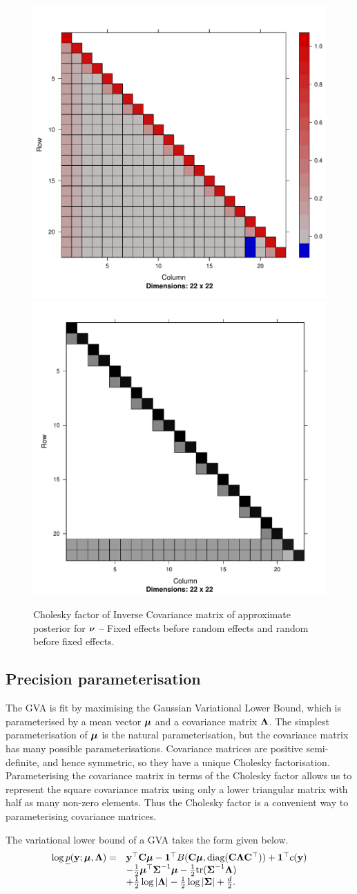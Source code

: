 \begin{figure}[h!]
	\includegraphics[width=0.35 \textwidth]{mX_mZ_cholesky.pdf}
	\includegraphics[width=0.35 \textwidth]{mZ_mX_cholesky.pdf}
	\bigskip 
	\caption{Cholesky factor of Inverse Covariance matrix of approximate posterior for ${\boldsymbol \nu}$ -- Fixed effects 
						before random effects and random before fixed effects.}
	\label{fig:cholfixedrandom}
\end{figure}

\newpage

\subsection{Precision parameterisation}

The GVA is fit by maximising the Gaussian
Variational Lower Bound, which is parameterised by a mean vector ${\boldsymbol \mu}$ and a
covariance matrix ${\boldsymbol \Lambda}$. The simplest parameterisation of ${\boldsymbol \mu}$ is the
natural parameterisation, but the covariance matrix has many possible
parameterisations. Covariance matrices are positive semi-definite, and hence
symmetric, so they have a unique Cholesky factorisation. Parameterising the
covariance matrix in terms of the Cholesky factor allows us to represent the
square covariance matrix using only a lower triangular matrix with half as many
non-zero elements. Thus the Cholesky factor is a convenient way to parameterising
covariance matrices.

The variational lower bound of a GVA takes the
form given below.
\begin{equation}
\label{eq:gva_lower_bound_precision_param2}
\begin{array}{ll}
\log \underline{p}({\bf y}; {\boldsymbol \mu}, {\boldsymbol \Lambda}) =& {\bf y}^\top {\bf C} {\boldsymbol\mu} - {\bf 1}^\top B({\bf C} {\boldsymbol \mu}, \text{diag}({\bf C} {\boldsymbol \Lambda} {\bf C}^\top)) + {\bf 1}^\top c({\bf y}) \\
&- \tfrac{1}{2} {\boldsymbol \mu}^\top {\boldsymbol\Sigma}^{-1} {\boldsymbol \mu} - \tfrac{1}{2} \text{tr}({\boldsymbol \Sigma}^{-1} {\boldsymbol \Lambda}) \\
&+ \tfrac{1}{2} \log |{\boldsymbol \Lambda}| - \tfrac{1}{2} \log |{\boldsymbol \Sigma}| + \tfrac{d}{2}.
\end{array}
\end{equation}

